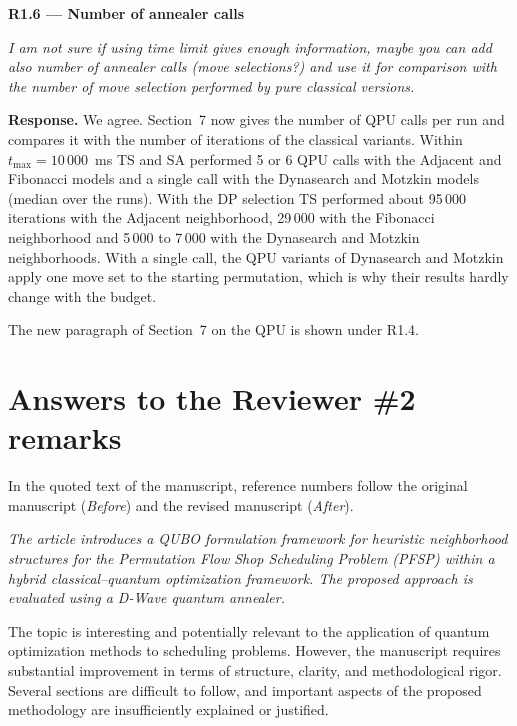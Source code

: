 \documentclass[12pt]{article}
\newenvironment{rc}[1]{\par\medskip\noindent\textbf{#1}\par\nopagebreak\noindent\itshape\renewcommand{\emph}[1]{\textbf{##1}}\ignorespaces}{\par}
\newenvironment{lead}{\par\medskip\noindent\itshape\renewcommand{\emph}[1]{\textbf{##1}}\ignorespaces}{\par}
\newcommand{\answer}[1]{\par\smallskip\noindent\textbf{Response.} #1\par}
\begin{document}
\begin{rc}{R1.6 --- Number of annealer calls}
I am not sure if using time limit gives enough information, maybe you can add also number of annealer calls (move selections?) and use it for comparison with the number of move selection performed by pure classical versions.
\end{rc}
\answer{We agree. Section~7 now gives the number of QPU calls per run and compares it with the number of iterations of the classical variants. Within $t_{\max}=10\,000$~ms TS and SA performed 5 or 6 QPU calls with the Adjacent and Fibonacci models and a single call with the Dynasearch and Motzkin models (median over the runs). With the DP selection TS performed about 95\,000 iterations with the Adjacent neighborhood, 29\,000 with the Fibonacci neighborhood and 5\,000 to 7\,000 with the Dynasearch and Motzkin neighborhoods. With a single call, the QPU variants of Dynasearch and Motzkin apply one move set to the starting permutation, which is why their results hardly change with the budget.}
The new paragraph of Section~7 on the QPU is shown under R1.4.

\newpage
\section*{Answers to the Reviewer \#2 remarks}

In the quoted text of the manuscript, reference numbers follow the original manuscript (\textit{Before}) and the revised manuscript (\textit{After}).

\begin{lead}
The article introduces a QUBO formulation framework for heuristic neighborhood structures for the Permutation Flow Shop Scheduling Problem (PFSP) within a hybrid classical--quantum optimization framework. The proposed approach is evaluated using a D-Wave quantum annealer.

The topic is interesting and potentially relevant to the application of quantum optimization methods to scheduling problems. However, the manuscript requires substantial improvement in terms of structure, clarity, and methodological rigor. Several sections are difficult to follow, and important aspects of the proposed methodology are insufficiently explained or justified.
\end{lead}
\end{document}
